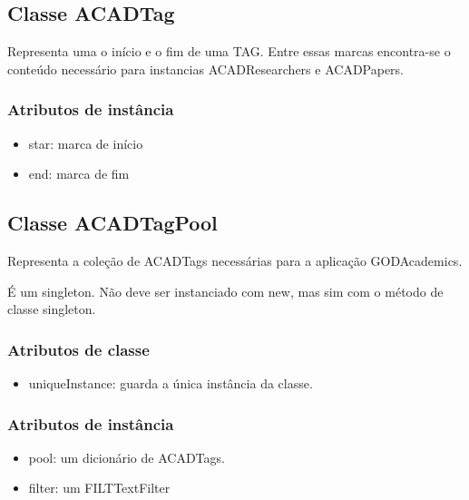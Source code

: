 \subsection{Classe ACADTag}

Representa uma o início e o fim de uma TAG. Entre essas marcas encontra-se o conteúdo necessário para instancias ACADResearchers e ACADPapers.

\subsubsection{Atributos de instância}

\begin{itemize}
  \item star: marca de início

  \item end: marca de fim

\end{itemize}

\subsection{Classe ACADTagPool}

Representa a coleção de ACADTags necessárias para a aplicação GODAcademics.

É um singleton. Não deve ser instanciado com new, mas sim com o método de classe singleton.

\subsubsection{Atributos de classe}

\begin{itemize}
  \item uniqueInstance: guarda a única instância da classe.
\end{itemize}

\subsubsection{Atributos de instância}

\begin{itemize}
  \item pool: um dicionário de ACADTags.

  \item filter: um FILTTextFilter

\end{itemize}


